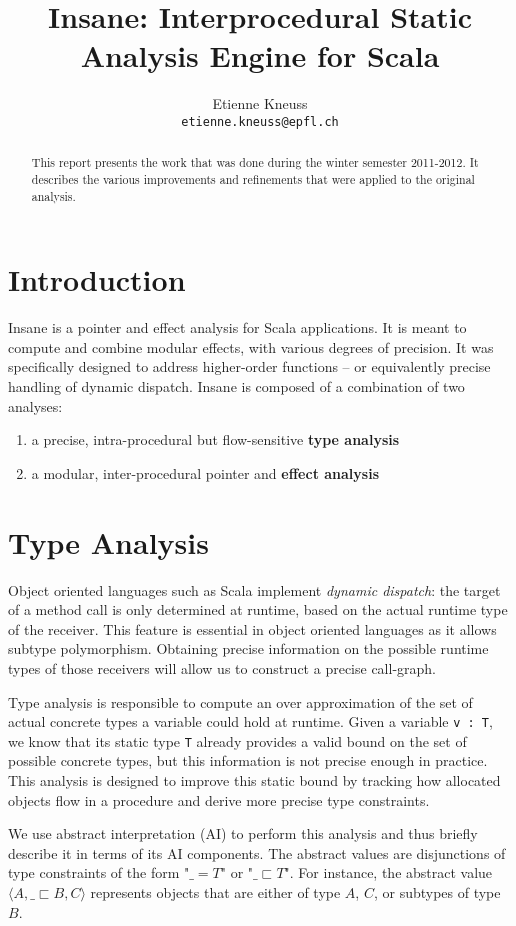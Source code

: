 \documentclass[a4paper]{article}
\author{Etienne Kneuss\\
\texttt{etienne.kneuss@epfl.ch}
}
\title{Insane: Interprocedural Static Analysis Engine for Scala}
\newcommand{\subtype}{\sqsubset}
\begin{document}
\maketitle
\begin{abstract}
  This report presents the work that was done during the winter semester
  2011-2012. It describes the various improvements and refinements that
  were applied to the original analysis.
\end{abstract}
\section{Introduction}
Insane is a pointer and effect analysis for Scala applications. It is meant to
compute and combine modular effects, with various degrees of precision. It was
specifically designed to address higher-order functions -- or equivalently
precise handling of dynamic dispatch. Insane is composed of a combination of
two analyses:

\begin{enumerate}
    \item a precise, intra-procedural but flow-sensitive \textbf{type analysis}
    \item a modular, inter-procedural pointer and \textbf{effect analysis}
\end{enumerate}

\section{Type Analysis}
Object oriented languages such as Scala implement \emph{dynamic dispatch}: the
target of a method call is only determined at runtime, based on the actual
runtime type of the receiver. This feature is essential in object oriented
languages as it allows subtype polymorphism. Obtaining precise information on
the possible runtime types of those receivers will allow us to construct a
precise call-graph.

Type analysis is responsible to compute an over approximation of the set of
actual concrete types a variable could hold at runtime. Given a variable
\verb=v : T=, we know that its static type \verb=T= already provides a valid
bound on the set of possible concrete types, but this information is not
precise enough in practice. This analysis is designed to improve this static
bound by tracking how allocated objects flow in a procedure and derive more
precise type constraints.

We use abstract interpretation (AI) to perform this analysis and thus briefly
describe it in terms of its AI components. The abstract values are disjunctions
of type constraints of the form "$\_ = T$" or "$\_ \subtype T$". For instance,
the abstract value $\langle A, \_ \subtype B, C \rangle$ represents objects
that are either of type $A$, $C$, or subtypes of type $B$.
\end{document}
